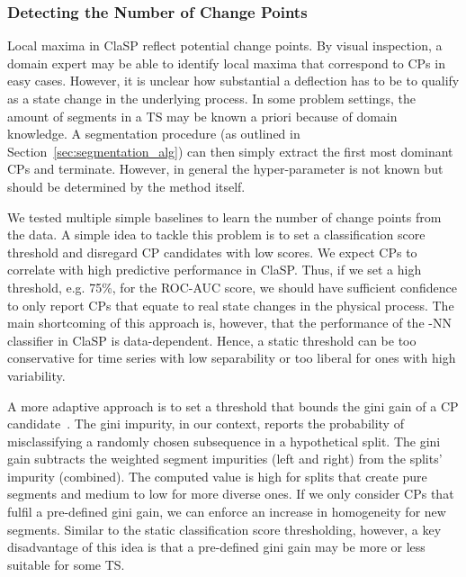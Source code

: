 \documentclass[pdflatex,sn-basic]{sn-jnl}
\begin{document}
\subsubsection{Detecting the Number of Change Points} \label{sec:cp-candidate-val}

Local maxima in ClaSP reflect potential change points. By visual inspection, a domain expert may be able to identify local maxima that correspond to CPs in easy cases. However, it is unclear how substantial a deflection has to be to qualify as a state change in the underlying process. In some problem settings, the amount of segments  in a TS may be known a priori because of domain knowledge. A segmentation procedure (as outlined in Section~\ref{sec:segmentation_alg}) can then simply extract the first  most dominant CPs and terminate. However, in general the hyper-parameter  is not known but should be determined by the method itself.

We tested multiple simple baselines to learn the number of change points from the data. A simple idea to tackle this problem is to set a classification score threshold and disregard CP candidates with low scores. We expect CPs to correlate with high predictive performance in ClaSP. Thus, if we set a high threshold, e.g. 75\%, for the ROC-AUC score, we should have sufficient confidence to only report CPs that equate to real state changes in the physical process. The main shortcoming of this approach is, however, that the performance of the -NN classifier in ClaSP is data-dependent. Hence, a static threshold can be too conservative for time series with low separability or too liberal for ones with high variability. 

A more adaptive approach is to set a threshold that bounds the gini gain of a CP candidate~\citep{Breiman2004TechnicalNS}. The gini impurity, in our context, reports the probability of misclassifying a randomly chosen subsequence in a hypothetical split. The gini gain subtracts the weighted segment impurities (left and right) from the splits' impurity (combined). The computed value is high for splits that create pure segments and medium to low for more diverse ones. If we only consider CPs that fulfil a pre-defined gini gain, we can enforce an increase in homogeneity for new segments. Similar to the static classification score thresholding, however, a key disadvantage of this idea is that a pre-defined gini gain may be more or less suitable for some TS.
\end{document}
